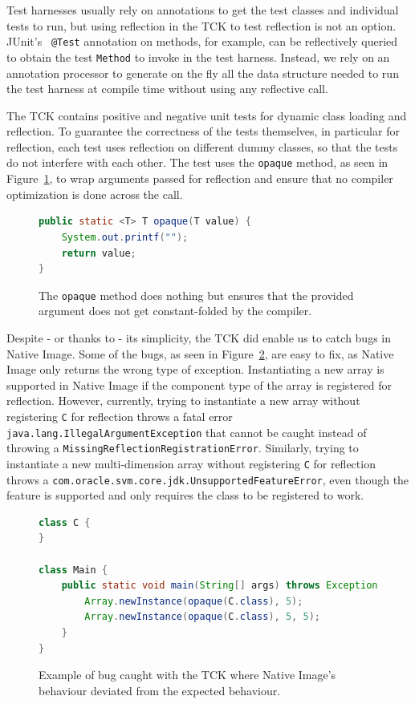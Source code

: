 Test harnesses usually rely on annotations to get the test classes and individual tests to run, but using reflection in the TCK to test reflection is not an option. JUnit's~\cite{noauthor_junit_nodate} \verb|@Test| annotation on methods, for example, can be reflectively queried to obtain the test \verb|Method| to invoke in the test harness. Instead, we rely on an annotation processor to generate on the fly all the data structure needed to run the test harness at compile time without using any reflective call.

The TCK contains positive and negative unit tests for dynamic class loading and reflection. To guarantee the correctness of the tests themselves, in particular for reflection, each test uses reflection on different dummy classes, so that the tests do not interfere with each other.
The test uses the \verb|opaque| method, as seen in Figure~\ref{fig:opaque}, to wrap arguments passed for reflection and ensure that no compiler optimization is done across the call.

\begin{figure}[ht]
    \centering
\begin{lstlisting}[language=Java]
public static <T> T opaque(T value) {
    System.out.printf("");
    return value;
}
\end{lstlisting}
    \caption{The \texttt{opaque} method does nothing but ensures that the provided argument does not get constant-folded by the compiler.}
    \label{fig:opaque}
\end{figure}

Despite - or thanks to - its simplicity, the TCK did enable us to catch bugs in Native Image. Some of the bugs, as seen in Figure~\ref{fig:new_multi_array_bug}, are easy to fix, as Native Image only returns the wrong type of exception.  
Instantiating a new array is supported in Native Image if the component type of the array is registered for reflection. However, currently, trying to instantiate a new array without registering \texttt{C} for reflection throws a fatal error \texttt{java.lang.IllegalArgumentException} that cannot be caught instead of throwing a \verb|MissingReflectionRegistrationError|. Similarly, trying to instantiate a new multi-dimension array without registering \texttt{C} for reflection throws a \texttt{com.oracle.svm.core.jdk.UnsupportedFeatureError}, even though the feature is supported and only requires the class to be registered to work.

\begin{figure}[ht]
    \centering
\begin{lstlisting}[language=Java]
class C {
}

class Main {
    public static void main(String[] args) throws Exception {
        Array.newInstance(opaque(C.class), 5);
        Array.newInstance(opaque(C.class), 5, 5);
    }
}
\end{lstlisting}
    \caption{Example of bug caught with the TCK where Native Image's behaviour deviated from the expected behaviour.}
    \label{fig:new_multi_array_bug}
\end{figure}

